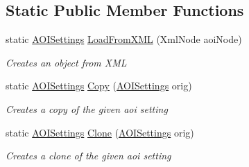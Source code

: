 \subsection*{Static Public Member Functions}
\begin{DoxyCompactItemize}
\item 
static \hyperlink{class_web_analyzer_1_1_models_1_1_settings_model_1_1_a_o_i_settings}{A\+O\+I\+Settings} \hyperlink{class_web_analyzer_1_1_models_1_1_settings_model_1_1_a_o_i_settings_ae2ef2eeabecd6cd2dbb8427370fa4ff0}{Load\+From\+X\+M\+L} (Xml\+Node aoi\+Node)
\begin{DoxyCompactList}\small\item\em Creates an object from X\+M\+L \end{DoxyCompactList}\item 
static \hyperlink{class_web_analyzer_1_1_models_1_1_settings_model_1_1_a_o_i_settings}{A\+O\+I\+Settings} \hyperlink{class_web_analyzer_1_1_models_1_1_settings_model_1_1_a_o_i_settings_a85c137ff1741cbd292804cb3ec94eca3}{Copy} (\hyperlink{class_web_analyzer_1_1_models_1_1_settings_model_1_1_a_o_i_settings}{A\+O\+I\+Settings} orig)
\begin{DoxyCompactList}\small\item\em Creates a copy of the given aoi setting \end{DoxyCompactList}\item 
static \hyperlink{class_web_analyzer_1_1_models_1_1_settings_model_1_1_a_o_i_settings}{A\+O\+I\+Settings} \hyperlink{class_web_analyzer_1_1_models_1_1_settings_model_1_1_a_o_i_settings_acf226641c18208967b6e193503bf1883}{Clone} (\hyperlink{class_web_analyzer_1_1_models_1_1_settings_model_1_1_a_o_i_settings}{A\+O\+I\+Settings} orig)
\begin{DoxyCompactList}\small\item\em Creates a clone of the given aoi setting \end{DoxyCompactList}\end{DoxyCompactItemize}
